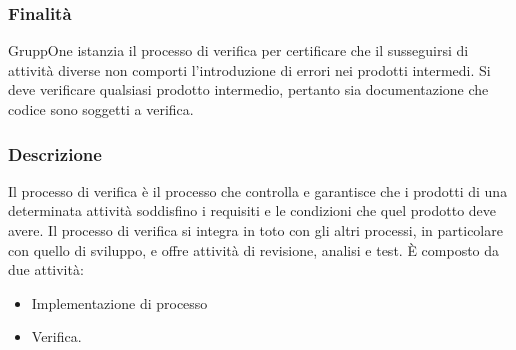 \documentclass[../../norme-di-progetto.tex]{subfiles}
\begin{document}
\subsubsection{Finalità}%
\label{subs:verifica/finalita}

GruppOne istanzia il processo di verifica per certificare che il susseguirsi di attività diverse non comporti l'introduzione di errori nei prodotti intermedi.
Si deve verificare qualsiasi prodotto intermedio, pertanto sia documentazione che codice sono soggetti a verifica.

\subsubsection{Descrizione}%
\label{subs:verifica/descrizione}

Il processo di verifica è il processo che controlla e garantisce che i prodotti di una determinata attività soddisfino i requisiti e le condizioni che quel prodotto deve avere. Il processo di verifica si integra in toto con gli altri processi, in particolare con quello di sviluppo, e offre attività di revisione, analisi e test. È composto da due attività:

\begin{itemize}
  \item Implementazione di processo
  \item Verifica.
\end{itemize}
\end{document}
